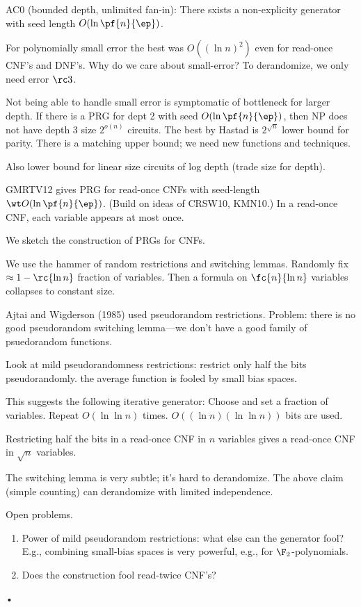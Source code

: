 AC0 (bounded depth, unlimited fan-in): There sxists a non-explicity generator with seed length $O(\ln \pf{n}{\ep})$.

For polynomially small error the best was $O((\ln n)^2)$ even for read-once CNF's and DNF's. Why do we care about small-error? To derandomize, we only need error $\rc3$.

Not being able to handle small error is symptomatic of bottleneck for larger depth. If there is a PRG for dept 2 with seed $O(\ln \pf{n}{\ep})$, then NP does not have depth 3 size $2^{o(n)}$ circuits. The best by Hastad is $2^{\sqrt n}$ lower bound for parity. There is a matching upper bound; we need new functions and techniques.

Also lower bound for linear size circuits of log depth (trade size for depth).

GMRTV12 gives PRG for read-once CNFs with seed-length $\wt O(\ln \pf{n}{\ep})$. (Build on ideas of CRSW10, KMN10.)
In a read-once CNF, each variable appears at most once.

We sketch the construction of PRGs for CNFs.

We use the hammer of random restrictions and switching lemmas. Randomly fix $\approx 1-\rc{\ln n}$ fraction of variables. Then a formula on $\fc{n}{\ln n}$ variables collapses to constant size.

Ajtai and Wigderson (1985) used pseudorandom restrictions. Problem: there is no good pseudorandom switching lemma---we don't have a good family of psuedorandom functions.

Look at mild pseudorandomness restrictions: restrict only half the bits pseudorandomly. the average function is fooled by small bias spaces.

This suggests the following iterative generator: Choose and set a fraction of variables. Repeat $O(\ln \ln n)$ times. $O((\ln n)(\ln \ln n))$ bits are used.

Restricting half the bits in a read-once CNF in $n $ variables gives a read-once CNF in $\sqrt n$ variables.

The switching lemma is very subtle; it's hard to derandomize. The above claim (simple counting) can derandomize with limited independence.

Open problems.
\begin{enumerate}
\item
Power of mild pseudorandom restrictions: what else can the generator fool? E.g., combining small-bias spaces is very powerful, e.g., for $\F_2$-polynomials.
\item
Does the construction fool read-twice CNF's?
\end{enumerate}•

